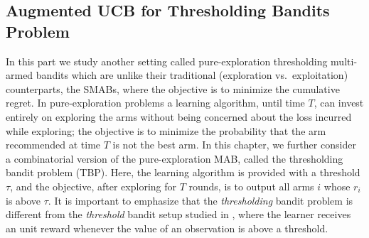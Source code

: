 \documentclass[MS,synopsis]{iitmdiss}
\begin{document}
%


\subsection{Augmented UCB for Thresholding Bandits Problem}

In this part we study another setting called pure-exploration thresholding multi-armed bandits which are unlike their traditional (exploration vs.\ exploitation)  counterparts, the SMABs, where the  objective is to minimize the cumulative regret. 
In pure-exploration problems a learning algorithm, until time $T$, can invest entirely on exploring the arms without being concerned about the loss incurred while exploring; the objective is to minimize the probability that the arm recommended at time $T$ is not the best arm.  In this chapter, we further consider a combinatorial version of the pure-exploration MAB, called the thresholding bandit problem (TBP).  Here, the learning algorithm is provided with a threshold $\tau$, and the objective, after exploring for $T$ rounds, is to  output all arms $i$ whose $r_{i}$ is above $\tau$. 
It is important to emphasize that the \emph{thresholding} bandit problem is different from the \emph{threshold} bandit setup studied in \cite{abernethy2016threshold}, where the learner receives an unit reward whenever the value of an observation is above a threshold. 
\end{document}
